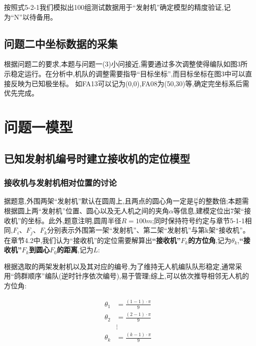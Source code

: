 \documentclass[withoutpreface,bwprint]{cumcmthesis}
\begin{document}
	按照式5-2-1我们模拟出100组测试数据用于“发射机”确定模型的精度验证,记为“N”以待备用。
	
	\subsection{问题二中坐标数据的采集}
	
	根据问题二的要求,本题与问题一(3)小问接近,需要通过多次调整使得编队如图3所示稳定运行。在分析中,机队的调整需要指导“目标坐标”,而目标坐标在图3中可以直接反映为已知极坐标。
	如FA13可以记为(0,0\textdegree),FA08为(50,30\textdegree)等,确定完坐标系后需优先完成。
	
	\section{问题一模型}
	\subsection{已知发射机编号时建立接收机的定位模型}
	\subsubsection{接收机与发射机相对位置的讨论}
	
	据题意,外围两架“发射机”默认在圆周上,且两点的圆心角一定是$\frac{pi}{9}$的整数倍;本题需根据圆上两“发射机”位置、圆心以及无人机之间的夹角$\alpha$等信息,建模定位出7架“接收机”的坐标。此外,题意注明,圆周半径$R=100m$;同时保持符号约定与章节5-1-1相同,$F_{i}$、$F_{j}$、$F_{k}$分别表示外围第一架“发射机”、第二架“发射机”与第k架“接收机”。在章节4.2中,我们认为“接收机”的定位需要解算出\textbf{“接收机”$F_{k}$的方位角},记为$\theta_{k}$,\textbf{“接收机”$F_{k}$到圆心$F_{0}$的距离},记为$L$:	
	
	根据选取的两架发射机以及其对应的编号,为了维持无人机编队队形稳定,通常采用“鸽群顺序”\cite{zzbh2015}编队(逆时针序依次编号),易于管理;综上,可以依次推导相邻无人机的方位角:
	
	\begin{equation}
		\tag{6-1-1}
		\begin{split}
			\theta_{1}&= \frac{(1-1)\cdot\pi}{9} \\
			\theta_{2}&= \frac{(2-1)\cdot\pi}{9}\\
			&\vdots\\
			\theta_{k}&= \frac{(k-1)\cdot\pi}{9}
		\end{split}	
	\end{equation}
	
\end{document}
